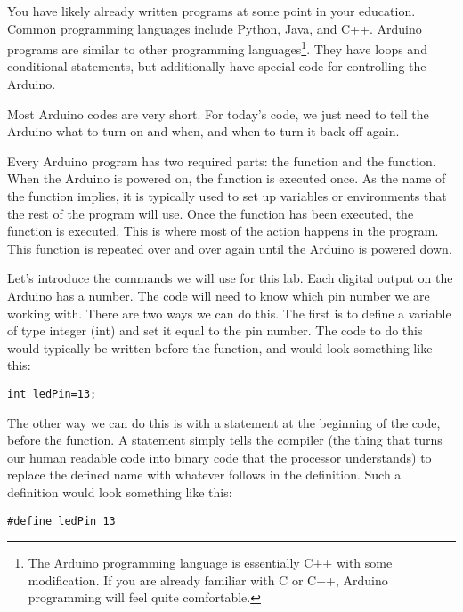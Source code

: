 You have likely already written programs at some point in your education. 
Common programming languages include Python, Java, and C++. Arduino programs
are similar to other programming languages\footnote{The Arduino programming
language is essentially C++ with some modification. If you are already familiar
with C or C++, Arduino programming will feel quite comfortable.}. 
They have loops and conditional statements, but additionally have special code
for controlling the Arduino.

Most Arduino codes are very short. For today's code, we just need to tell the
Arduino what to turn on and when, and when to turn it back off again.

Every Arduino program has two required parts: the  function and
the  function. When the Arduino is powered on, the 
function is executed once. As the name of the function implies, it is typically
used to set up variables or environments that the rest of the program will use.
Once the  function has been executed, the  function
is executed. This is where most of the action happens in the program. This 
function is repeated over and over again until the Arduino is powered down.

Let's introduce the commands we will use for this lab. Each digital output on
the Arduino has a number. The code will need to know which pin number we are
working with. There are two ways we can do this. The first is to define a 
variable of type integer (int) and set it equal to the pin number. The code to
do this would typically be written before the  function, and 
would look something like this:
\begin{lstlisting}[language=Arduino] 
int ledPin=13;
\end{lstlisting}
The other way we can do this is with a  
statement at the beginning of the code,
before the  function.
A  statement 
simply tells the compiler (the thing that turns our human
readable code into binary code that the processor understands) to replace the
defined name with whatever follows in the definition. Such a definition would
look something like this:
\begin{lstlisting}[language=Arduino] 
#define ledPin 13
\end{lstlisting}

